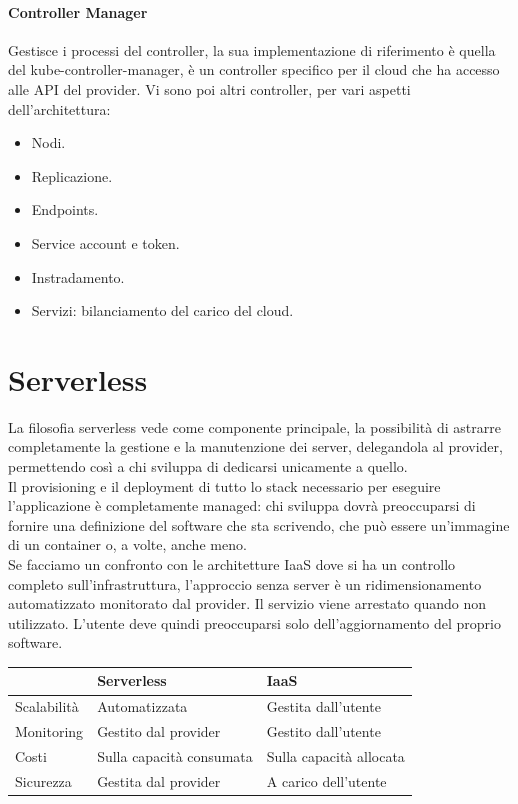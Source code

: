 \documentclass{article}
\begin{document}
		\paragraph{Controller Manager}
		Gestisce i processi del controller, la sua implementazione di riferimento è quella del kube-controller-manager, è un controller specifico per il cloud che ha accesso alle API del provider. Vi sono poi altri controller, per vari aspetti dell'architettura:
		\begin{itemize}
		    \item Nodi.
		    \item Replicazione.
		    \item Endpoints.
		    \item Service account e token.
		    \item Instradamento.
		    \item Servizi: bilanciamento del carico del cloud.
		\end{itemize}
		
		\newpage
		\section{Serverless}
		La filosofia serverless vede come componente principale, la possibilità di astrarre completamente la gestione e la manutenzione dei server, delegandola al provider, permettendo così a chi sviluppa di dedicarsi unicamente a quello.\\
		Il provisioning e il deployment di tutto lo stack necessario per eseguire l’applicazione è completamente managed: chi sviluppa dovrà preoccuparsi di fornire una definizione	del software che sta scrivendo, che può essere un’immagine di un container o, a volte, anche meno.\\
		Se facciamo un confronto con le architetture IaaS dove si ha un controllo completo sull'infrastruttura, l'approccio senza server è un ridimensionamento automatizzato monitorato dal provider. Il servizio viene arrestato quando non utilizzato. L'utente deve quindi preoccuparsi solo dell'aggiornamento del proprio software.
		
		\begin{table}[ht]
			\centering
			\begin{tabular}{|l|l|l|}
			\hline
			            & Serverless               & IaaS                    \\ \hline
			Scalabilità & Automatizzata            & Gestita dall'utente     \\ \hline
			Monitoring  & Gestito dal provider     & Gestito dall'utente     \\ \hline
			Costi       & Sulla capacità consumata & Sulla capacità allocata \\ \hline
			Sicurezza   & Gestita dal provider     & A carico dell'utente    \\ \hline
			\end{tabular}
		\end{table}
		
\end{document}
